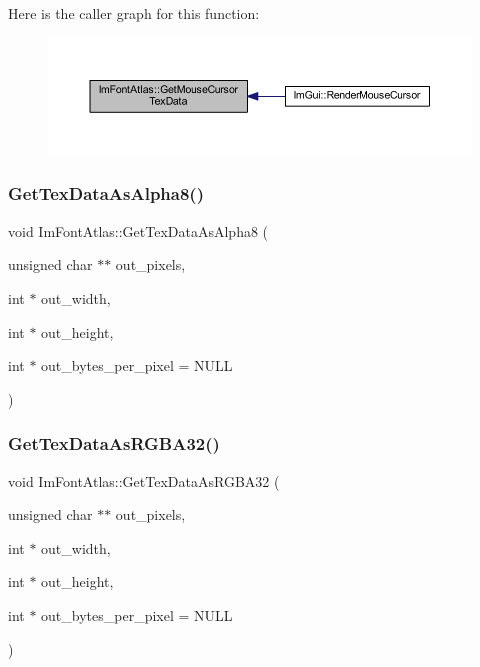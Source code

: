 Here is the caller graph for this function\+:
\nopagebreak
\begin{figure}[H]
\begin{center}
\leavevmode
\includegraphics[width=350pt]{struct_im_font_atlas_a6d27a36fe034851310dd00d7dc5253c3_icgraph}
\end{center}
\end{figure}
\mbox{\label{struct_im_font_atlas_aeff1a1044a1ab68d8f27bb2819cd9f44}} 
\subsubsection{\texorpdfstring{Get\+Tex\+Data\+As\+Alpha8()}{GetTexDataAsAlpha8()}}
{\footnotesize\ttfamily void Im\+Font\+Atlas\+::\+Get\+Tex\+Data\+As\+Alpha8 (\begin{DoxyParamCaption}\item[{unsigned char $\ast$$\ast$}]{out\+\_\+pixels,  }\item[{int $\ast$}]{out\+\_\+width,  }\item[{int $\ast$}]{out\+\_\+height,  }\item[{int $\ast$}]{out\+\_\+bytes\+\_\+per\+\_\+pixel = {\ttfamily NULL} }\end{DoxyParamCaption})}

\mbox{\label{struct_im_font_atlas_a8abb0c4e67ebb38249d4df71218c4eec}} 
\subsubsection{\texorpdfstring{Get\+Tex\+Data\+As\+R\+G\+B\+A32()}{GetTexDataAsRGBA32()}}
{\footnotesize\ttfamily void Im\+Font\+Atlas\+::\+Get\+Tex\+Data\+As\+R\+G\+B\+A32 (\begin{DoxyParamCaption}\item[{unsigned char $\ast$$\ast$}]{out\+\_\+pixels,  }\item[{int $\ast$}]{out\+\_\+width,  }\item[{int $\ast$}]{out\+\_\+height,  }\item[{int $\ast$}]{out\+\_\+bytes\+\_\+per\+\_\+pixel = {\ttfamily NULL} }\end{DoxyParamCaption})}

